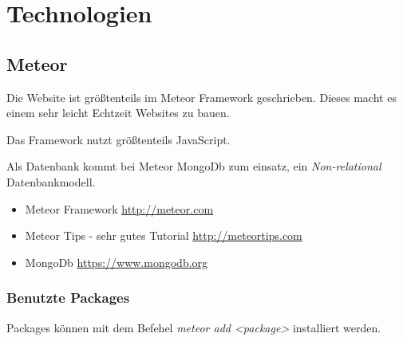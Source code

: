 \documentclass[Info_VK_Website_Dokumentation.tex]{subfiles}
\begin{document}
	
\chapter{Technologien}



\section{Meteor} 

Die Website ist größtenteils im Meteor Framework geschrieben. Dieses macht es einem sehr leicht Echtzeit Websites zu bauen.

Das Framework nutzt größtenteils JavaScript.

Als Datenbank kommt bei Meteor MongoDb zum einsatz, ein \emph{Non-relational} Datenbankmodell.

\begin{itemize}
 	\item Meteor Framework \url{http://meteor.com} \\
 	\item Meteor Tips - sehr gutes Tutorial \url{http://meteortips.com} \\
 	\item MongoDb \url{https://www.mongodb.org} \\ 
\end{itemize} 

\subsection{Benutzte Packages}

Packages können mit dem Befehel \emph{meteor add <package>} installiert werden.
\end{document}
